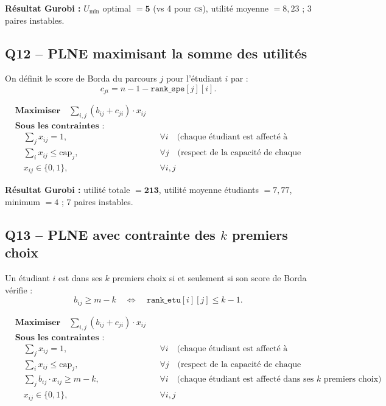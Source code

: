 \documentclass[11pt,a4paper]{article}
\newcommand{\GS}{\textsc{gs}}
\begin{document}
\textbf{Résultat Gurobi :} $U_{\min}$ optimal $= \mathbf{5}$ (vs 4 pour \GS), utilité moyenne $= 8{,}23$ ; 3 paires instables.

\subsection*{Q12 -- PLNE maximisant la somme des utilités}

On définit le score de Borda du parcours $j$ pour l'étudiant $i$ par :
\[
  c_{ji} = n - 1 - \texttt{rank\_spe}[j][i].
\]

\bigskip
\begin{equation*}
\begin{aligned}
  &\textbf{Maximiser} \quad \sum_{i,j} (b_{ij} + c_{ji}) \cdot x_{ij} \\[6pt]
  &\textbf{Sous les contraintes :} \\[4pt]
  &\quad \sum_{j} x_{ij} = 1, && \forall i \quad \text{(chaque étudiant est affecté à exactement un parcours)} \\[4pt]
  &\quad \sum_{i} x_{ij} \leq \mathrm{cap}_j, && \forall j \quad \text{(respect de la capacité de chaque parcours)} \\[4pt]
  &\quad x_{ij} \in \{0,1\}, && \forall i, j
\end{aligned}
\end{equation*}

\textbf{Résultat Gurobi :} utilité totale $= \mathbf{213}$, utilité moyenne étudiants $= 7{,}77$, minimum $= 4$ ; 7 paires instables.

\subsection*{Q13 -- PLNE avec contrainte des $k$ premiers choix}

Un étudiant $i$ est dans ses $k$ premiers choix si et seulement si son score de Borda vérifie :
\[
  b_{ij} \geq m - k \quad \Longleftrightarrow \quad \texttt{rank\_etu}[i][j] \leq k - 1.
\]

\bigskip
\begin{equation*}
\begin{aligned}
  &\textbf{Maximiser} \quad \sum_{i,j} (b_{ij} + c_{ji}) \cdot x_{ij} \\[6pt]
  &\textbf{Sous les contraintes :} \\[4pt]
  &\quad \sum_{j} x_{ij} = 1, && \forall i \quad \text{(chaque étudiant est affecté à exactement un parcours)} \\[4pt]
  &\quad \sum_{i} x_{ij} \leq \mathrm{cap}_j, && \forall j \quad \text{(respect de la capacité de chaque parcours)} \\[4pt]
  &\quad \sum_{j} b_{ij} \cdot x_{ij} \geq m - k, && \forall i \quad \text{(chaque étudiant est affecté dans ses $k$ premiers choix)} \\[4pt]
  &\quad x_{ij} \in \{0,1\}, && \forall i, j
\end{aligned}
\end{equation*}
\end{document}
